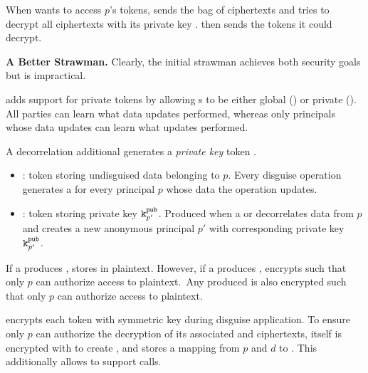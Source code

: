 When  wants to access $p$'s tokens, \sys sends  the bag of ciphertexts and 
tries to decrypt all ciphertexts with its private key .
 then sends \sys the tokens it could decrypt.

\vspace{6pt}
\noindent\textbf{A Better Strawman.}
Clearly, the initial strawman achieves both security goals but is impractical.



\sys adds support for private tokens by allowing s to be either global () or
private ().  All parties can learn what data updates  performed, whereas only
principals whose data  updates can learn what updates  performed.


\noindent
A decorrelation  additional generates a \emph{private key} token .
\begin{itemize}
    \item {}: token storing undisguised data belonging to $p$.
    Every disguise operation generates a  for every principal $p$ whose data the operation
    updates.
\item {}: token storing private key $\texttt{\ensuremath{\texttt{k}^{\text{pub}}_{p'}}}$. Produced when a  or  
    decorrelates data from $p$ and creates a new anonymous principal $p'$ with corresponding private key $\texttt{\ensuremath{\texttt{k}^{\text{pub}}_{p'}}}$.
\end{itemize}

If a  produces , \sys stores  in plaintext.
However, if a  produces , \sys encrypts  
such that only $p$ can authorize access to  plaintext.\
Any produced  is also encrypted such that only $p$ can authorize access to  plaintext.

\sys encrypts each token with symmetric key  during disguise application. 
To ensure only $p$ can authorize the decryption of its associated \tdata{pd} and 
ciphertexts, \symk{pd} itself is encrypted with \pubk{p} to create , and \sys stores a mapping
from $p$ and $d$ to \ek{pd}. This additionally allows \sys to support \fn{LoadEncKey/LoadEncKeys}
calls.

